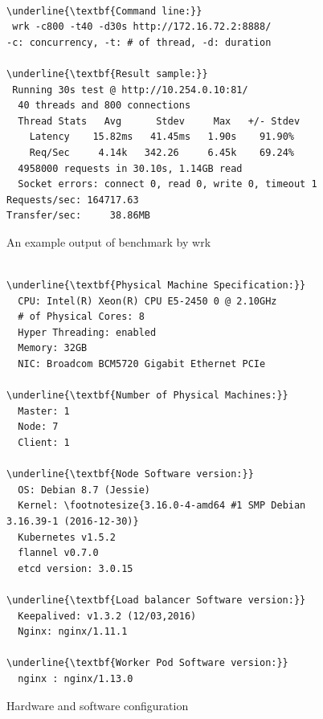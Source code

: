 \begin{figure}
\begin{minipage}{\columnwidth}
\small
\begin{Verbatim}[commandchars=\\\{\}]

\underline{\textbf{Command line:}}
 wrk -c800 -t40 -d30s http://172.16.72.2:8888/
-c: concurrency, -t: # of thread, -d: duration

\underline{\textbf{Result sample:}}
 Running 30s test @ http://10.254.0.10:81/
  40 threads and 800 connections
  Thread Stats   Avg      Stdev     Max   +/- Stdev
    Latency    15.82ms   41.45ms   1.90s    91.90%
    Req/Sec     4.14k   342.26     6.45k    69.24%
  4958000 requests in 30.10s, 1.14GB read
  Socket errors: connect 0, read 0, write 0, timeout 1
Requests/sec: 164717.63
Transfer/sec:     38.86MB

\end{Verbatim}
\end{minipage}
\caption{An example output of benchmark by wrk}
\label{fig:benchmark example}
\end{figure}

\begin{figure}
\begin{minipage}{0.9\columnwidth}
\small
\begin{Verbatim}[commandchars=\\\{\}]

\underline{\textbf{Physical Machine Specification:}}
  CPU: Intel(R) Xeon(R) CPU E5-2450 0 @ 2.10GHz
  # of Physical Cores: 8
  Hyper Threading: enabled
  Memory: 32GB
  NIC: Broadcom BCM5720 Gigabit Ethernet PCIe

\underline{\textbf{Number of Physical Machines:}}
  Master: 1
  Node: 7
  Client: 1

\underline{\textbf{Node Software version:}}
  OS: Debian 8.7 (Jessie)
  Kernel: \footnotesize{3.16.0-4-amd64 #1 SMP Debian 3.16.39-1 (2016-12-30)}
  Kubernetes v1.5.2
  flannel v0.7.0
  etcd version: 3.0.15

\underline{\textbf{Load balancer Software version:}}
  Keepalived: v1.3.2 (12/03,2016)
  Nginx: nginx/1.11.1

\underline{\textbf{Worker Pod Software version:}}
  nginx : nginx/1.13.0 

\end{Verbatim}
\end{minipage}
\caption{Hardware and software configuration}
\label{fig:Hardware and software configuration}
\end{figure}


